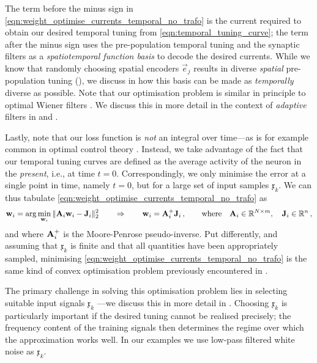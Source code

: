 The term before the minus sign in \cref{eqn:weight_optimise_currents_temporal_no_trafo} is the current required to obtain our desired temporal tuning from \cref{eqn:temporal_tuning_curve}; the term after the minus sign uses the pre-population temporal tuning and the synaptic filters as a \emph{spatiotemporal function basis} to decode the desired currents.
While we know that randomly choosing spatial encoders $\vec e_j$ results in diverse \emph{spatial} pre-population tuning (), we discuss in  how this basis can be made as \emph{temporally} diverse as possible.
Note that our optimisation problem is similar in principle to optimal Wiener filters \citep[Chapter~2]{wiener1949extrapolation,haykin2014adaptive}.
We discuss this in more detail in the context of \emph{adaptive} filters in  and .

Lastly, note that our loss function is \emph{not} an integral over time---as is for example common in optimal control theory \citep[e.g.,][Chapter~14]{brogan1991modern}.
Instead, we take advantage of the fact that our temporal tuning curves are defined as the average activity of the neuron in the \emph{present}, i.e., at time $t = 0$.
Correspondingly, we only minimise the error at a single point in time, namely $t = 0$, but for a large set of input samples $\mathfrak{x}_k$.
We can thus tabulate \cref{eqn:weight_optimise_currents_temporal_no_trafo} as
\begin{align*}
	\mathbf{w}_i = \arg\min_{\mathbf{w}_i} \| \mathbf{A}_i \mathbf{w}_i - \mathbf{J}_i \|_2^2 \quad\quad \Rightarrow \quad\quad \mathbf{w}_i = \mathbf{A}_i^+ \mathbf{J}_i \,, \quad\quad \text{where} \quad \mathbf{A}_i \in \mathbb{R}^{N \times m}, \quad \mathbf{J}_i \in \mathbb{R}^n \,,
\end{align*}
and where $\mathbf{A}_i^+$ is the Moore-Penrose pseudo-inverse.
Put differently, and assuming that $\mathfrak{x}_k$ is finite and that all quantities have been appropriately sampled, minimising \cref{eqn:weight_optimise_currents_temporal_no_trafo} is the same kind of convex optimisation problem previously encountered in .

The primary challenge in solving this optimisation problem lies in selecting suitable input signals $\mathfrak{x}_k$ \citep[cf.][Section~10.2.5]{verhaegen2007filtering}---we discuss this in more detail in .
Choosing $\mathfrak{x}_k$ is particularly important if the desired tuning cannot be realised precisely; the frequency content of the training signals then determines the regime over which the approximation works well.
In our examples we use low-pass filtered white noise as $\mathfrak{x}_k$.

